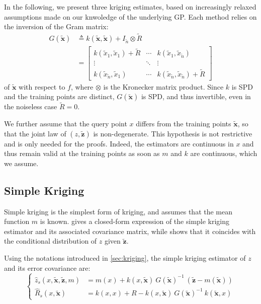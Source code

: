 In the following, we present three kriging estimates, based on increasingly relaxed assumptions made on our knwoledge of the underlying GP. Each method relies on the inversion of the Gram matrix:
\begin{equation}
	\begin{aligned}
	G(\tilde{\mathbf{x}})&\triangleq k(\tilde{\mathbf{x}},\tilde{\mathbf{x}})+I_{\tilde{n}}\otimes\tilde{R}\\
	&=\begin{bmatrix}
	k(\tilde{x}_1,\tilde{x}_1)+\tilde{R}&\cdots&k(\tilde{x}_1,\tilde{x}_{\tilde{n}})\\\vdots&\ddots&\vdots\\k(\tilde{x}_{\tilde{n}},\tilde{x}_1)&\cdots&k(\tilde{x}_{\tilde{n}},\tilde{x}_{\tilde{n}})+\tilde{R}
	\end{bmatrix}
	\end{aligned}\label{eq:Gram_matrix}
\end{equation}
of $\tilde{\mathbf{x}}$ with respect to $f$, where $\otimes$ is the Kronecker matrix product. Since $k$ is SPD and the training points are distinct, $G(\tilde{\mathbf{x}})$ is SPD, and thus invertible, even in the noiseless case $\tilde{R}=0$.

We further assume that the query point $x$ differs from the training points $\tilde{\mathbf{x}}$, so that the joint law of $(z,\tilde{\mathbf{z}})$ is non-degenerate. This hypothesis is not restrictive and is only needed for the proofs. Indeed, the estimators are continuous in $x$ and thus remain valid at the training points as soon as $m$ and $k$ are continuous, which we assume.

\subsection{Simple Kriging}

Simple kriging is the simplest form of kriging, and assumes that the mean function $m$ is known.  gives a closed-form expression of the simple kriging estimator and its associated covariance matrix, while  shows that it coincides with the conditional distribution of $z$ given $\tilde{\mathbf{z}}$.

\begin{proposition}\label{th:simple_kriging}
	Using the notations introduced in \cref{sec:kriging}, the simple kriging estimator of $z$ and its error covariance are:
	\begin{equation}
		\left\{\begin{aligned}
		\hat{z}_s(x,\tilde{\mathbf{x}},\tilde{\mathbf{z}},m)&=m(x)+k(x,\tilde{\mathbf{x}})\:G(\tilde{\mathbf{x}})^{-1}\:(\tilde{\mathbf{z}}-m(\tilde{\mathbf{x}}))\\
		\hat{R}_s(x,\tilde{\mathbf{x}})&=k(x,x)+R-k(x,\tilde{\mathbf{x}})\:G(\tilde{\mathbf{x}})^{-1}\:k\left(\tilde{\mathbf{x}},x\right)
		\end{aligned}\right.\label{eq:simple_kriging_equations}
	\end{equation}
\end{proposition}

